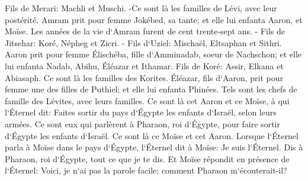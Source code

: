 \verse Fils de Merari: Machli et Muschi. -Ce sont là les familles de Lévi, avec leur postérité. 
\verse Amram prit pour femme Jokébed, sa tante; et elle lui enfanta Aaron, et Moïse. Les années de la vie d`Amram furent de cent trente-sept ans. - 
\verse Fils de Jitsehar: Koré, Népheg et Zicri. - 
\verse Fils d`Uziel: Mischaël, Eltsaphan et Sithri. 
\verse Aaron prit pour femme Élischéba, fille d`Amminadab, soeur de Nachschon; et elle lui enfanta Nadab, Abihu, Éléazar et Ithamar. 
\verse Fils de Koré: Assir, Elkana et Abiasaph. Ce sont là les familles des Korites. 
\verse Éléazar, fils d`Aaron, prit pour femme une des filles de Puthiel; et elle lui enfanta Phinées. Tels sont les chefs de famille des Lévites, avec leurs familles. 
\verse Ce sont là cet Aaron et ce Moïse, à qui l`Éternel dit: Faites sortir du pays d`Égypte les enfants d`Israël, selon leurs armées. 
\verse Ce sont eux qui parlèrent à Pharaon, roi d`Égypte, pour faire sortir d`Égypte les enfants d`Israël. Ce sont là ce Moïse et cet Aaron. 
\verse Lorsque l`Éternel parla à Moïse dans le pays d`Égypte, 
\verse l`Éternel dit à Moïse: Je suis l`Éternel. Dis à Pharaon, roi d`Égypte, tout ce que je te dis. 
\verse Et Moïse répondit en présence de l`Éternel: Voici, je n`ai pas la parole facile; comment Pharaon m`écouterait-il? 

